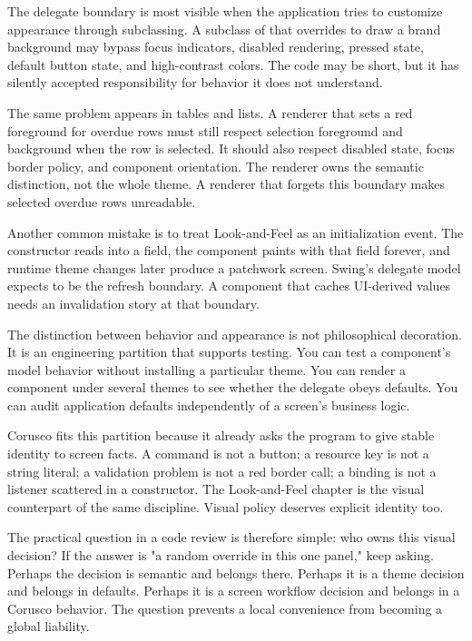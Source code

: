 The delegate boundary is most visible when the application tries to customize appearance through subclassing. A subclass of  that overrides  to draw a brand background may bypass focus indicators, disabled rendering, pressed state, default button state, and high-contrast colors. The code may be short, but it has silently accepted responsibility for behavior it does not understand.

The same problem appears in tables and lists. A renderer that sets a red foreground for overdue rows must still respect selection foreground and background when the row is selected. It should also respect disabled state, focus border policy, and component orientation. The renderer owns the semantic distinction, not the whole theme. A renderer that forgets this boundary makes selected overdue rows unreadable.

Another common mistake is to treat Look-and-Feel as an initialization event. The constructor reads  into a field, the component paints with that field forever, and runtime theme changes later produce a patchwork screen. Swing's delegate model expects  to be the refresh boundary. A component that caches UI-derived values needs an invalidation story at that boundary.

The distinction between behavior and appearance is not philosophical decoration. It is an engineering partition that supports testing. You can test a component's model behavior without installing a particular theme. You can render a component under several themes to see whether the delegate obeys defaults. You can audit application defaults independently of a screen's business logic.

Corusco fits this partition because it already asks the program to give stable identity to screen facts. A command is not a button; a resource key is not a string literal; a validation problem is not a red border call; a binding is not a listener scattered in a constructor. The Look-and-Feel chapter is the visual counterpart of the same discipline. Visual policy deserves explicit identity too.

The practical question in a code review is therefore simple: who owns this visual decision? If the answer is "a random override in this one panel," keep asking. Perhaps the decision is semantic and belongs there. Perhaps it is a theme decision and belongs in defaults. Perhaps it is a screen workflow decision and belongs in a Corusco behavior. The question prevents a local convenience from becoming a global liability.

